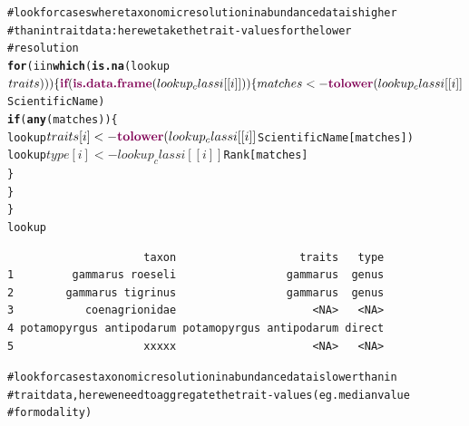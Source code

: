 \documentclass[letterpaper,superscriptaddress,showkeys,longbibliography,10pt]{revtex4-1}\usepackage{graphicx, color}
\makeatletter
\newcommand{\hlfunctioncall}[1]{\textcolor[rgb]{0.501960784313725,0,0.329411764705882}{\textbf{#1}}}%
\newcommand{\hlcomment}[1]{\textcolor[rgb]{0.180392156862745,0.6,0.341176470588235}{#1}}%
\newenvironment{kframe}{%
 \def\at@end@of@kframe{}%
 \ifinner\ifhmode%
  \def\at@end@of@kframe{\end{minipage}}%
  \begin{minipage}{\columnwidth}%
 \fi\fi%
 \def\FrameCommand##1{\hskip\@totalleftmargin \hskip-\fboxsep
 \colorbox{shadecolor}{##1}\hskip-\fboxsep
     \hskip-\linewidth \hskip-\@totalleftmargin \hskip\columnwidth}%
 \MakeFramed {\advance\hsize-\width
   \@totalleftmargin\z@ \linewidth\hsize
   \@setminipage}}%
 {\par\unskip\endMakeFramed%
 \at@end@of@kframe}
\newenvironment{knitrout}{}{} %
\makeatother
\begin{document}
\begin{appendices}
\begin{knitrout}
\color{fgcolor}\begin{kframe}
\begin{alltt}
\hlcomment{# look for cases where taxonomic resolution in abundance data is higher}
\hlcomment{# than in trait data: here we take the trait-values for the lower}
\hlcomment{# resolution}
\hlfunctioncall{for} (i in \hlfunctioncall{which}(\hlfunctioncall{is.na}(lookup$traits))) \{
    \hlfunctioncall{if} (\hlfunctioncall{is.data.frame}(lookup_classi[[i]])) \{
        matches <- \hlfunctioncall{tolower}(lookup_classi[[i]]$ScientificName) %
        \hlfunctioncall{if} (\hlfunctioncall{any}(matches)) \{
            lookup$traits[i] <- \hlfunctioncall{tolower}(lookup_classi[[i]]$ScientificName[matches])
            lookup$type[i] <- lookup_classi[[i]]$Rank[matches]
        \}
    \}
\}
lookup
\end{alltt}
\begin{verbatim}
                     taxon                   traits   type
1         gammarus roeseli                 gammarus  genus
2        gammarus tigrinus                 gammarus  genus
3           coenagrionidae                     <NA>   <NA>
4 potamopyrgus antipodarum potamopyrgus antipodarum direct
5                    xxxxx                     <NA>   <NA>
\end{verbatim}
\begin{alltt}

\hlcomment{# look for cases taxonomic resolution in abundance data is lower than in}
\hlcomment{# trait data, here we need to aggregate the trait-values (eg. median value}
\hlcomment{# for modality)}


\end{alltt}
\end{kframe}
\end{knitrout}
\end{appendices}
\end{document}
